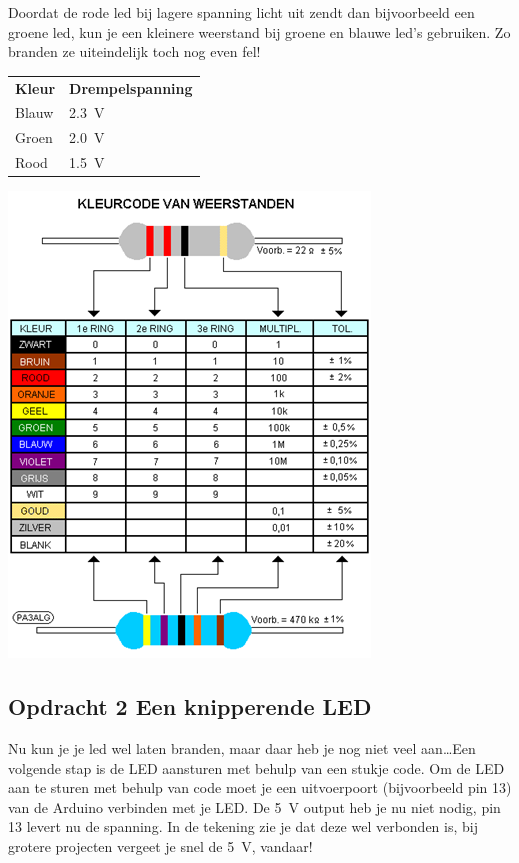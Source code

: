 \documentclass{arduino}
\begin{document}
Doordat de rode led bij lagere spanning licht uit zendt dan bijvoorbeeld een groene led, kun je een kleinere weerstand bij groene en blauwe led’s gebruiken. Zo branden ze uiteindelijk toch nog even fel!

\begin{tabular}{ll}
\textbf{Kleur} & \textbf{Drempelspanning}\\
Blauw & \SI{2.3}{\volt} \\ 
Groen & \SI{2.0}{\volt} \\
Rood  & \SI{1.5}{\volt} \\
\end{tabular}

\begin{minipage}[t]{\linewidth}
\includegraphics[width=0.8\linewidth]{7. Component resistor values (NL)}
\end{minipage}

\newpage
\subsection{Opdracht 2 Een knipperende LED}


Nu kun je je led wel laten branden, maar daar heb je nog niet veel aan\dots Een volgende stap is de LED aansturen met behulp van een stukje code. Om de LED aan te sturen met behulp van code moet je een uitvoerpoort (bijvoorbeeld pin 13) van de Arduino verbinden met je LED. De \SI{5}{\volt} output heb je nu niet nodig, pin 13 levert nu de spanning. In de tekening zie je dat deze wel verbonden is, bij grotere projecten vergeet je snel de \SI{5}{\volt}, vandaar!
\end{document}
